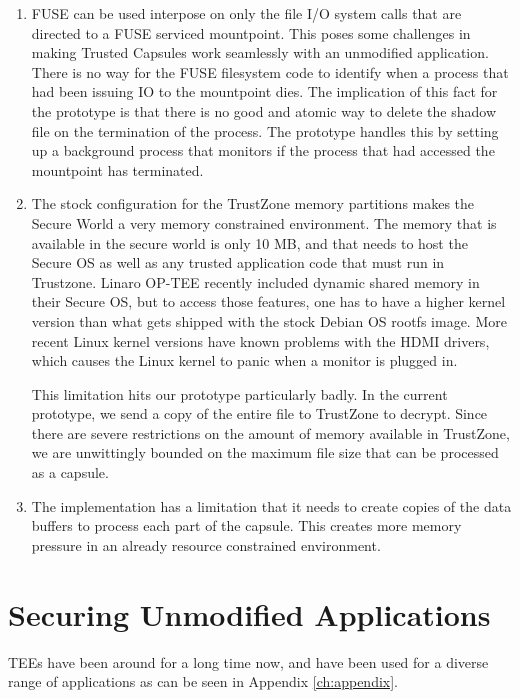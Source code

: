\begin{enumerate}
    \item FUSE can be used interpose on only the file I/O system calls that are
directed to a FUSE serviced mountpoint. This poses some challenges in making
Trusted Capsules work seamlessly with an unmodified application.\\There is no
way for the FUSE filesystem code to identify when a process that had been
issuing IO to the mountpoint dies. The implication of this fact for the
prototype is that there is no good and atomic way to delete the shadow file on
the termination of the process. The prototype handles this by setting up a
background process that monitors if the process that had accessed the mountpoint
has terminated.
    \item The stock configuration for the TrustZone memory partitions makes the
Secure World a very memory constrained environment. The memory that is available
in the secure world is only 10 MB, and that needs to host the Secure OS as well
as any trusted application code that must run in Trustzone. Linaro OP-TEE
recently included dynamic shared memory in their Secure OS, but to access those
features, one has to have a higher kernel version than what gets shipped with
the stock Debian OS rootfs image. More recent Linux kernel versions have known
problems with the HDMI drivers, which causes the Linux kernel to panic when a
monitor is plugged in.

This limitation hits our prototype particularly badly. In the
current prototype, we send a copy of the entire file to TrustZone to decrypt.
Since there are severe restrictions on the amount of memory available in
TrustZone, we are unwittingly bounded on the maximum file size that can be
processed as a capsule.
    \item The implementation has a limitation that it
needs to create copies of the data buffers to process each part of the capsule.
This creates more memory pressure in an already resource constrained
environment. 
\end{enumerate}

\section{Securing Unmodified Applications}

TEEs have been around for a long time now, and have been used for a diverse
range of applications as can be seen in Appendix \ref{ch:appendix}. 
